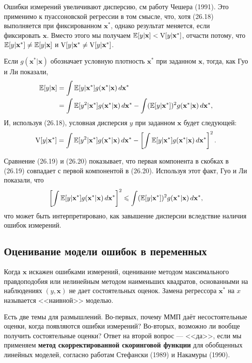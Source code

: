 Ошибки измерений увеличивают дисперсию, см работу Чешера (1991). Это применимо к пуассоновской регрессии в том смысле, что, хотя (26.18) выполняется при фиксированном $\mathbf{x^*}$, однако результат меняется, если фиксировать  $\mathbf{x}$. Вместо этого мы получаем $\mathbb{E}[y| \mathbf{x}]<\mathrm{V}[y| \mathbf{x^*}]$, отчасти потому, что $\mathbb{E}[y| \mathbf{x^*}] \neq \mathbb{E}[y| \mathbf{x}]$  и $\mathrm{V}[y| \mathbf{x^*} \neq \mathrm{V}[y| \mathbf{x^*}]$.

Если $g(\mathbf{x^*|x})$ обозначает условную плотность $\mathbf{x^*}$ при заданном $\mathbf{x}$, тогда, как Гуо и Ли показали, 
\begin{align}
\mathbb{E}[y| \mathbf{x}] &= \int \mathbb{E}[y| \mathbf{x^*}]g(\mathbf{x^*|x})\, d\mathbf{x^*} \notag \\
&= \int \mathbb{E}[y^2| \mathbf{x^*}]g(\mathbf{x^*|x})\, d\mathbf{x^*} - \int (\mathbb{E}[y| \mathbf{x^*}])^2 g(\mathbf{x^*|x})\, d\mathbf{x^*},
\end{align}
И, используя (26.18), условная дисперсия $y$ при заданном $\mathbf{x}$ будет следующей:
\begin{equation}
\mathrm{V}[y| \mathbf{x^*}]= \int \mathbb{E}[y^2| \mathbf{x^*}]g(\mathbf{x^*|x})\, d\mathbf{x^*} -  \left[ \int \mathbb{E}[y| \mathbf{x^*}]g(\mathbf{x^*|x})\, d\mathbf{x^*} \right]^2.
\end{equation}

Сравнение (26.19) и (26.20) показывает, что первая компонента в скобках в (26.19) совпадает с первой компонентой в (26.20). Используя этот факт, Гуо и Ли  показали, что
\begin{equation}
 \left[ \int \mathbb{E}[y| \mathbf{x^*}]g(\mathbf{x^*|x})\, d\mathbf{x^*} \right]^2 \leqslant \int (\mathbb{E}[y| \mathbf{x^*}])^2 g(\mathbf{x^*|x})\, d\mathbf{x^*},
\end{equation}
что может быть интерпретировано, как завышение дисперсии вследствие наличия ошибок измерений.

\subsection*{Оценивание модели ошибок в переменных} 
Когда $\mathbf{x}$ искажен ошибками измерений, оценивание методом максимального правдоподобия или нелинейным методом наименьших квадратов, основанными на наблюдениях $(y, \mathbf{x})$ не  дает состоятельных оценок. Замена  регрессора $\mathbf{x^*}$ на $x$ называется <<наивной>> моделью.

Есть две темы для размышлений. Во-первых, почему ММП даёт несостоятельные оценки, когда появляются ошибки измерений? Во-вторых, возможно ли вообще получить состоятельные оценки? Ответ на второй вопрос –-- <<да>>, если мы применяем {\bf метод скорректированной скоринговой функции} для обобщенных линейных моделей, согласно работам Стефански (1989) и Накамуры (1990). 

